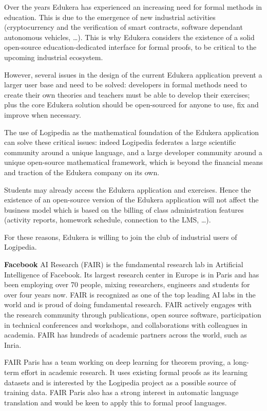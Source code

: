 Over the years Edukera has experienced an increasing need for formal
methods in education. This is due to the emergence of new industrial
activities (cryptocurrency and the verification of smart contracts,
software dependant autonomous vehicles, \ldots). This is why Edukera
considers the existence of a solid open-source education-dedicated
interface for formal proofs, to be critical to the upcoming industrial
ecosystem.

However, several issues in the design of the current Edukera
application prevent a larger user base and need to be solved:
developers in formal methods need to create their own theories and
teachers must be able to develop their exercises; plus the core
Edukera solution should be open-sourced for anyone to use, fix and
improve when necessary.

The use of Logipedia as the mathematical foundation of the Edukera
application can solve these critical issues: indeed Logipedia
federates a large scientific community around a unique language, and a
large developer community around a unique open-source mathematical
framework, which is beyond the financial means and traction of the
Edukera company on its own.

Students may already access the Edukera application and
exercises. Hence the existence of an open-source version of the
Edukera application will not affect the business model which is based
on the billing of class administration features (activity reports,
homework schedule, connection to the LMS, \ldots).

For these reasons, Edukera is willing to join the club of industrial
users of Logipedia.

{\bf Facebook} AI Research (FAIR) is the fundamental research lab in
Artificial Intelligence of Facebook. Its largest research center in
Europe is in Paris and has been employing over 70 people, mixing
researchers, engineers and students for over four years now. FAIR is
recognized as one of the top leading AI labs in the world and is proud
of doing fundamental research. FAIR actively engages with the research
community through publications, open source software, participation in
technical conferences and workshops, and collaborations with
colleagues in academia. FAIR has hundreds of academic partners across
the world, such as Inria.

FAIR Paris has a team working on deep learning for theorem proving, a
long-term effort in academic research. It uses existing formal proofs
as its learning datasets and is interested by the Logipedia project as
a possible source of training data. FAIR Paris also has a strong
interest in automatic language translation and would be keen to apply
this to formal proof languages.

